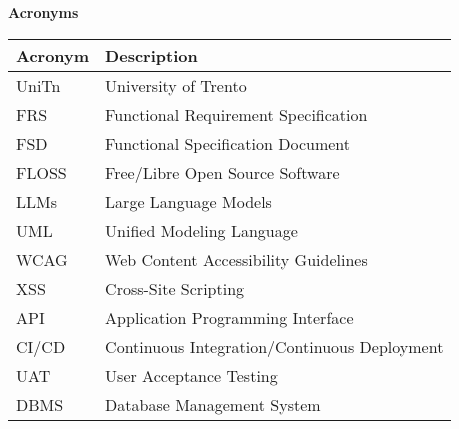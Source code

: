 \textcolor{RFIGreen}{\Large\bf Acronyms}

\begin{center}

\begin{tabular}{|p{5cm}|p{9cm}|}
\hline
{\small\bf Acronym} & {\small\bf Description}\\
\hline

UniTn & University of Trento\\
FRS & Functional Requirement Specification\\
FSD & Functional Specification Document\\
FLOSS & Free/Libre Open Source Software\\
LLMs & Large Language Models\\
UML & Unified Modeling Language\\
WCAG & Web Content Accessibility Guidelines\\
XSS & Cross-Site Scripting\\
API & Application Programming Interface\\
CI/CD & Continuous Integration/Continuous Deployment\\
UAT & User Acceptance Testing\\
DBMS & Database Management System\\

\hline

\end{tabular}

\end{center}

\newpage
